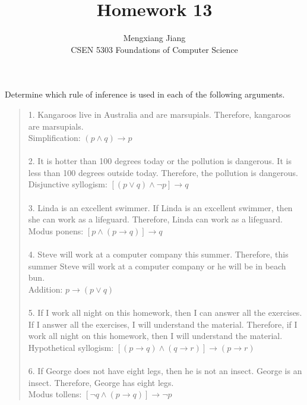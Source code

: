 \documentclass[12pt]{article}
\newenvironment{problem}[2][Problem]{\begin{trivlist}
\item[\hskip \labelsep {\bfseries #1}\hskip \labelsep {\bfseries #2.}]}{\end{trivlist}}
\begin{document}
 
 
\title{Homework 13}%
\author{Mengxiang Jiang\\ %
CSEN 5303 Foundations of Computer Science} %
 
\maketitle

\begin{problem}{1}
    Determine which rule of inference is used in each of the following arguments.
    \begin{quote}
        1. Kangaroos live in Australia and are marsupials. Therefore, kangaroos are marsupials.\\
        Simplification: $(p \land q) \rightarrow p$\\\\
        2. It is hotter than 100 degrees today or the pollution is dangerous. It is less than 100 degrees
        outside today. Therefore, the pollution is dangerous.\\
        Disjunctive syllogism: $[(p \lor q) \land \neg p] \rightarrow q$\\\\
        3. Linda is an excellent swimmer. If Linda is an excellent swimmer, then she can work as a
        lifeguard. Therefore, Linda can work as a lifeguard.\\
        Modus ponens: $[p \land (p \rightarrow q)] \rightarrow q$\\\\
        4. Steve will work at a computer company this summer. Therefore, this summer Steve will
        work at a computer company or he will be in beach bun.\\
        Addition: $p \rightarrow (p \lor q)$\\\\
        5. If I work all night on this homework, then I can answer all the exercises. If I answer all the
        exercises, I will understand the material. Therefore, if I work all night on this homework,
        then I will understand the material.\\
        Hypothetical syllogism: $[(p \rightarrow q) \land (q \rightarrow r)] \rightarrow (p \rightarrow r)$\\\\
        6. If George does not have eight legs, then he is not an insect. George is an insect. Therefore,
        George has eight legs.\\
        Modus tollens: $[\neg q \land (p \rightarrow q)] \rightarrow \neg p$
    \end{quote}
\end{problem}
\end{document}
